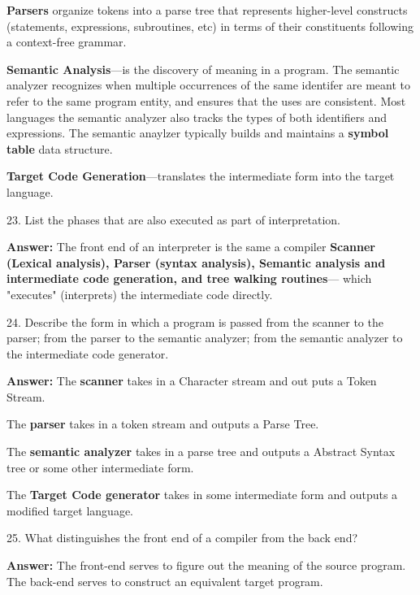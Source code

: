 \vskip 1mm
{\bf Parsers} organize tokens into a parse tree that represents  higher-level constructs (statements, expressions, subroutines, etc) in terms of their constituents following a context-free grammar.

\vskip 1mm
{\bf Semantic Analysis}---is the discovery of meaning in a program. The semantic analyzer recognizes when multiple occurrences of the same identifer are meant to refer to the same program entity, and ensures that the uses are consistent. Most languages the semantic analyzer also tracks the types of both identifiers and expressions. The semantic anaylzer typically builds and maintains a {\bf symbol table} data structure.

\vskip 1mm
{\bf Target Code Generation}---translates the intermediate form into the target language.

\filbreak
\vskip 1cm

23. List the phases that are also executed as part of interpretation.

\vskip 3mm
{\bf Answer:} The front end of an interpreter is the same a compiler {\bf Scanner (Lexical analysis), Parser (syntax analysis), Semantic analysis and intermediate code generation, and tree walking routines}--- which "executes" (interprets) the intermediate code directly.

\filbreak
\vskip 1cm

24. Describe the form in which a program is passed from the scanner to the parser; from the parser to the semantic analyzer; from the semantic analyzer to the intermediate code generator.

\vskip 3mm
{\bf Answer:} The {\bf scanner} takes in a Character stream and out puts a Token Stream.

\vskip 2mm
The {\bf parser} takes in a token stream and outputs a Parse Tree.

\vskip 2mm
The {\bf semantic analyzer} takes in a parse tree and outputs a Abstract Syntax tree or some other intermediate form.

\vskip 2mm
The {\bf Target Code generator} takes in some intermediate form and outputs a modified target language.
\filbreak
\vskip 1cm

25. What distinguishes the front end of a compiler from the back end?

\vskip 3mm
{\bf Answer:} The front-end serves to figure out the meaning of the source program. The back-end serves to construct an equivalent target program.

\filbreak
\vskip 1cm

